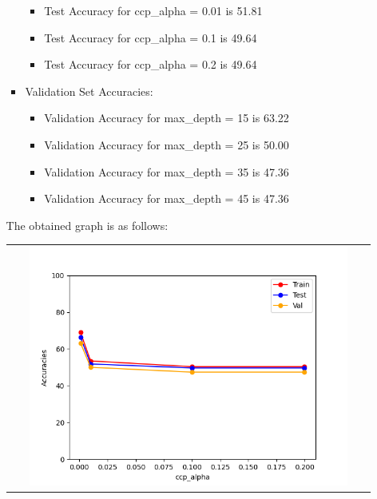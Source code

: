 \begin{enumerate}[label=(\alph*)]
\begin{enumerate}[label=\roman*.]
\begin{itemize}
\begin{itemize}
                                  \item Test Accuracy for ccp\_alpha = 0.01 is 51.81
                                  \item Test Accuracy for ccp\_alpha = 0.1 is 49.64
                                  \item Test Accuracy for ccp\_alpha = 0.2 is 49.64
                              \end{itemize}
                        \item Validation Set Accuracies:
                              \begin{itemize}
                                  \item Validation Accuracy for max\_depth = 15 is 63.22
                                  \item Validation Accuracy for max\_depth = 25 is 50.00
                                  \item Validation Accuracy for max\_depth = 35 is 47.36
                                  \item Validation Accuracy for max\_depth = 45 is 47.36
                              \end{itemize}
                    \end{itemize}
                    \newpage
                    The obtained graph is as follows:
                    \begin{center}
                        \begin{tabular}{c}
                            \includegraphics[width=0.9\textwidth]{./images/q1_part_d_pruning.png}
                        \end{tabular}
                    \end{center}

\end{enumerate}
\end{enumerate}
